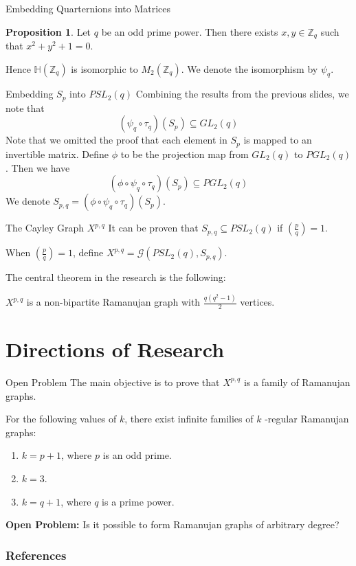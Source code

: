 \documentclass[10pt]{beamer}
\newcommand{\leg}[2]{\left(\frac{#1}{#2}\right)}
\theoremstyle{definition}\newtheorem{proposition}{Proposition}
\begin{document}
\begin{frame}{Embedding Quarternions into Matrices}
\begin{proposition}
Let $q$ be an odd prime power. Then there exists $x,y \in \mathbb{Z}_q$ such that $x^2 + y^2 + 1= 0$. 
\end{proposition}

Hence $\mathbb{H}(\mathbb{Z}_q)$ is isomorphic to $M_2(\mathbb{Z}_q)$. We denote the isomorphism by $\psi_q$. 
\end{frame}

\begin{frame}{Embedding $S_p$ into $PSL_2(q)$}
Combining the results from the previous slides, we note that
\[(\psi_q \circ \tau_q)(S_p) \subseteq GL_2(q)\] 
Note that we omitted the proof that each element in $S_p$ is mapped to an invertible matrix.
\pause
Define $\phi$ to be the projection map from $GL_2(q)$ to $PGL_2(q)$. Then we have
\[(\phi \circ \psi_q \circ \tau_q)(S_p) \subseteq PGL_2(q)\]
We denote $S_{p,q} = (\phi \circ \psi_q \circ \tau_q)(S_p)$.
\end{frame}

\begin{frame}{The Cayley Graph $X^{p,q}$}
It can be proven that $S_{p,q} \subseteq PSL_2(q)$ if $\leg{p}{q} = 1$. 

When $\leg{p}{q} = 1$, define $X^{p,q} = \mathcal{G}(PSL_2(q), S_{p,q})$. \pause

The central theorem in the research is the following:

\begin{theorem}
$X^{p,q}$ is a non-bipartite Ramanujan graph with $\frac{q(q^2-1)}{2}$ vertices.
\end{theorem}

\end{frame}
\section{Directions of Research}

\begin{frame}{Open Problem}
The main objective is to prove that $X^{p,q}$ is a family of Ramanujan graphs. \pause

\begin{theorem}
For the following values of $k$, there exist infinite families of $k$ -regular Ramanujan graphs:

\begin{enumerate}
\item $k = p + 1$, where $p$ is an odd prime.
\item $k = 3$.
\item $k = q+1$, where $q$ is a prime power.
\end{enumerate} \pause

\textbf{Open Problem: }Is it possible to form Ramanujan graphs of arbitrary degree?
\end{theorem}
\end{frame}

\begin{frame}[allowframebreaks]
 \frametitle{References}
 \nocite{*}
        
        
\end{frame}

\end{document}

